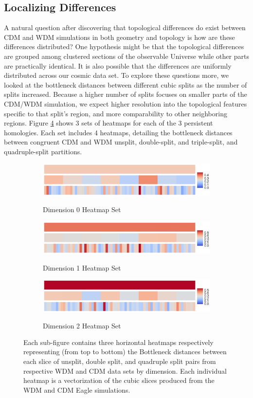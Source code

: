 \documentclass[12pt]{article}
\begin{document}
\subsection{Localizing Differences}
A natural question after discovering that topological differences do exist between CDM and WDM simulations in both geometry and topology is how are these differences distributed? One hypothesis might be that the topological differences are grouped among clustered sections of the observable Universe while other parts are practically identical. It is also possible that the differences are uniformly distributed across our cosmic data set. To explore these questions more, we looked at the bottleneck distances between different cubic splits as the number of splits increased. Because a higher number of splits focuses on smaller parts of the CDM/WDM simulation, we expect higher resolution into the topological features specific to that split's region, and more comparability to other neighboring regions. Figure \ref{fig:cubeHeatmap} shows 3 sets of heatmaps for each of the 3 persistent homologies. Each set includes 4 heatmaps, detailing the bottleneck distances between congruent CDM and WDM unsplit, double-split, and triple-split, and quadruple-split partitions. 

\begin{figure}[htp!]
  \centering
    \begin{subfigure}{\textwidth}
    \centering
        \caption{Dimension 0 Heatmap Set}
        \includegraphics[width=0.6\linewidth]{hmap_dim0_nonorm.pdf}
    \label{fig:cubeHeatmap0}
  \end{subfigure}
    \begin{subfigure}{\textwidth}
    \centering
    \caption{Dimension 1 Heatmap Set}
        \includegraphics[width=0.6\linewidth]{hmap_dim1_nonorm.pdf}
    \label{fig:cubeHeatmap1}
  \end{subfigure}
    \begin{subfigure}{\textwidth}
    \centering
        \caption{Dimension 2 Heatmap Set}
        \includegraphics[width=0.6\linewidth]{hmap_dim2_nonorm.pdf}
    \label{fig:cubeHeatmap2}
  \end{subfigure}
    \caption{Each sub-figure contains three horizontal heatmaps respectively representing (from top to bottom) the  Bottleneck distances between each slice of unsplit, double split, and quadruple split pairs from respective WDM and CDM data sets by dimension. Each individual heatmap is a  vectorization of the cubic slices produced from the WDM and CDM Eagle simulations.}
    \label{fig:cubeHeatmap}
\end{figure}
\end{document}
